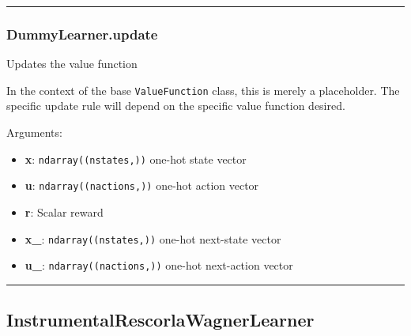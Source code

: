 \begin{center}\rule{0.5\linewidth}{\linethickness}\end{center}

\hypertarget{dummylearner.update}{%
\subsubsection{DummyLearner.update}\label{dummylearner.update}}

\begin{Shaded}
\begin{Highlighting}[]
\end{Highlighting}
\end{Shaded}

Updates the value function

In the context of the base \texttt{ValueFunction} class, this is merely
a placeholder. The specific update rule will depend on the specific
value function desired.

Arguments:

\begin{itemize}
\tightlist
\item
  \textbf{x}: \texttt{ndarray((nstates,))} one-hot state vector
\item
  \textbf{u}: \texttt{ndarray((nactions,))} one-hot action vector
\item
  \textbf{r}: Scalar reward
\item
  \textbf{x\_}: \texttt{ndarray((nstates,))} one-hot next-state vector
\item
  \textbf{u\_}: \texttt{ndarray((nactions,))} one-hot next-action vector
\end{itemize}

\begin{center}\rule{0.5\linewidth}{\linethickness}\end{center}

\hypertarget{instrumentalrescorlawagnerlearner}{%
\subsection{InstrumentalRescorlaWagnerLearner}\label{instrumentalrescorlawagnerlearner}}

\begin{Shaded}
\begin{Highlighting}[]
\end{Highlighting}
\end{Shaded}

